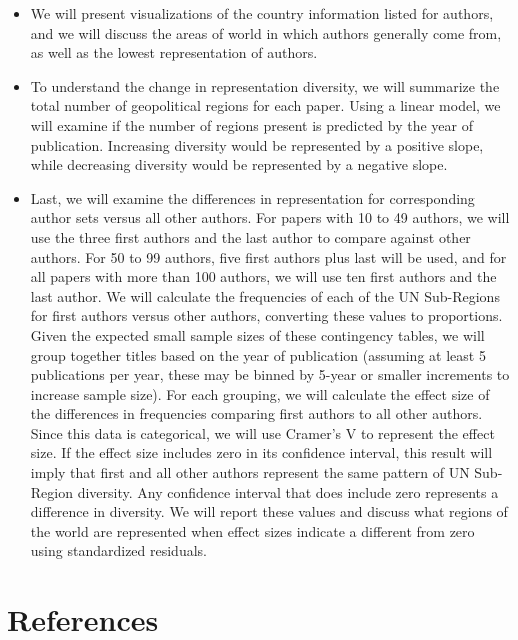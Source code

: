 \documentclass[
  man]{apa7}
\providecommand{\tightlist}{%
  \setlength{\itemsep}{0pt}\setlength{\parskip}{0pt}}
\begin{document}
\begin{itemize}
\tightlist
\item
  We will present visualizations of the country information listed for
  authors, and we will discuss the areas of world in which authors
  generally come from, as well as the lowest representation of
  authors.
\item
  To understand the change in representation diversity, we will
  summarize the total number of geopolitical regions for each paper.
  Using a linear model, we will examine if the number of regions
  present is predicted by the year of publication. Increasing
  diversity would be represented by a positive slope, while decreasing
  diversity would be represented by a negative slope.
\item
  Last, we will examine the differences in representation for
  corresponding author sets versus all other authors. For papers with
  10 to 49 authors, we will use the three first authors and the last
  author to compare against other authors. For 50 to 99 authors, five
  first authors plus last will be used, and for all papers with more
  than 100 authors, we will use ten first authors and the last author.
  We will calculate the frequencies of each of the UN Sub-Regions for
  first authors versus other authors, converting these values to
  proportions. Given the expected small sample sizes of these
  contingency tables, we will group together titles based on the year
  of publication (assuming at least 5 publications per year, these may
  be binned by 5-year or smaller increments to increase sample size).
  For each grouping, we will calculate the effect size of the
  differences in frequencies comparing first authors to all other
  authors. Since this data is categorical, we will use Cramer's V to
  represent the effect size. If the effect size includes zero in its
  confidence interval, this result will imply that first and all other
  authors represent the same pattern of UN Sub-Region diversity. Any
  confidence interval that does include zero represents a difference
  in diversity. We will report these values and discuss what regions
  of the world are represented when effect sizes indicate a different
  from zero using standardized residuals.
\end{itemize}

\newpage

\hypertarget{references}{%
\section{References}\label{references}}
\end{document}
